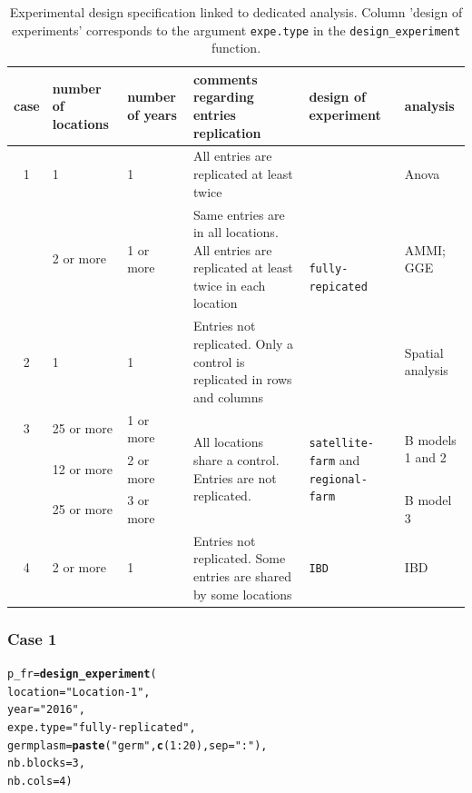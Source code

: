 \documentclass{book}\usepackage[]{graphicx}\usepackage[]{color}
\makeatletter
\newcommand{\hlnum}[1]{\textcolor[rgb]{0.686,0.059,0.569}{#1}}%
\newcommand{\hlstr}[1]{\textcolor[rgb]{0.192,0.494,0.8}{#1}}%
\newcommand{\hlopt}[1]{\textcolor[rgb]{0,0,0}{#1}}%
\newcommand{\hlstd}[1]{\textcolor[rgb]{0.345,0.345,0.345}{#1}}%
\newcommand{\hlkwb}[1]{\textcolor[rgb]{0.69,0.353,0.396}{#1}}%
\newcommand{\hlkwc}[1]{\textcolor[rgb]{0.333,0.667,0.333}{#1}}%
\newcommand{\hlkwd}[1]{\textcolor[rgb]{0.737,0.353,0.396}{\textbf{#1}}}%
\newenvironment{kframe}{%
 \def\at@end@of@kframe{}%
 \ifinner\ifhmode%
  \def\at@end@of@kframe{\end{minipage}}%
  \begin{minipage}{\columnwidth}%
 \fi\fi%
 \def\FrameCommand##1{\hskip\@totalleftmargin \hskip-\fboxsep
 \colorbox{shadecolor}{##1}\hskip-\fboxsep
     \hskip-\linewidth \hskip-\@totalleftmargin \hskip\columnwidth}%
 \MakeFramed {\advance\hsize-\width
   \@totalleftmargin\z@ \linewidth\hsize
   \@setminipage}}%
 {\par\unskip\endMakeFramed%
 \at@end@of@kframe}
\newenvironment{knitrout}{}{} %
\makeatother
\begin{document}
\begin{table}[H]
\begin{tabular}{
c
p{}
p{}
p{}
p{}
p{}
}
\hline
case & number of locations & number of years & comments regarding entries replication & design of experiment & analysis \\
\hline
1 & 1 & 1 & All entries are replicated at least twice & \multirow{3}{.2\textwidth}{\texttt{fully-repicated}} & Anova \\
\cline{2-4}\cline{6-6}
  & 2 or more & 1 or more & Same entries are in all locations. All entries are replicated at least twice in each location & & AMMI; GGE \\
\hline
2 & 1 & 1 & Entries not replicated. Only a control is replicated in rows and columns & \texttt{row-column} & Spatial analysis \\
\hline
3 & 25 or more & 1 or more & \multirow{3}{.35\textwidth}{All locations share a control. Entries are not replicated.} & \multirow{3}{.2\textwidth}{\texttt{satellite-farm} and \texttt{regional-farm}} & \multirow{2}{.1\textwidth}{B models 1 and 2} \\
  & 12 or more & 2 or more & & & \\
  \cline{2-3} \cline{6-6}
  & 25 or more & 3 or more & & & B model 3 \\
\hline
4 & 2 or more & 1 & Entries not replicated. Some entries are shared by some locations & \texttt{IBD} & IBD \\
\hline
\end{tabular}
\caption{Experimental design specification linked to dedicated analysis. Column 'design of experiments' corresponds to the argument \texttt{expe.type} in the \texttt{design\_experiment} function.}
\label{cases_expe}
\end{table}


\subsubsection{Case 1}
\begin{knitrout}
\color{fgcolor}\begin{kframe}
\begin{alltt}
\hlstd{p_fr} \hlkwb{=} \hlkwd{design_experiment}\hlstd{(}
  \hlkwc{location} \hlstd{=} \hlstr{"Location-1"}\hlstd{,}
  \hlkwc{year} \hlstd{=} \hlstr{"2016"}\hlstd{,}
  \hlkwc{expe.type} \hlstd{=} \hlstr{"fully-replicated"}\hlstd{,}
  \hlkwc{germplasm} \hlstd{=} \hlkwd{paste}\hlstd{(}\hlstr{"germ"}\hlstd{,} \hlkwd{c}\hlstd{(}\hlnum{1}\hlopt{:}\hlnum{20}\hlstd{),} \hlkwc{sep} \hlstd{=} \hlstr{":"}\hlstd{),}
  \hlkwc{nb.blocks} \hlstd{=} \hlnum{3}\hlstd{,}
  \hlkwc{nb.cols} \hlstd{=} \hlnum{4}\hlstd{)}
\end{alltt}
\end{kframe}
\end{knitrout}
\end{document}
